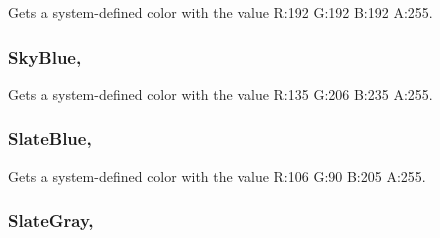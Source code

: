 Gets a system-\/defined color with the value R\+:192 G\+:192 B\+:192 A\+:255.

\hypertarget{structMicrosoft_1_1Xna_1_1Framework_1_1Color_ac3790779955b5c2931d801e40544c3c5}{}
\subsubsection[{Sky\+Blue}]{ Sky\+Blue\hspace{0.3cm}{\ttfamily [static]}, {\ttfamily [get]}}\label{structMicrosoft_1_1Xna_1_1Framework_1_1Color_ac3790779955b5c2931d801e40544c3c5}


Gets a system-\/defined color with the value R\+:135 G\+:206 B\+:235 A\+:255.

\hypertarget{structMicrosoft_1_1Xna_1_1Framework_1_1Color_a5c0c65acec90aac1948898b030dc211e}{}
\subsubsection[{Slate\+Blue}]{ Slate\+Blue\hspace{0.3cm}{\ttfamily [static]}, {\ttfamily [get]}}\label{structMicrosoft_1_1Xna_1_1Framework_1_1Color_a5c0c65acec90aac1948898b030dc211e}


Gets a system-\/defined color with the value R\+:106 G\+:90 B\+:205 A\+:255.

\hypertarget{structMicrosoft_1_1Xna_1_1Framework_1_1Color_a66808c67c15816890404de88552761d7}{}
\subsubsection[{Slate\+Gray}]{ Slate\+Gray\hspace{0.3cm}{\ttfamily [static]}, {\ttfamily [get]}}\label{structMicrosoft_1_1Xna_1_1Framework_1_1Color_a66808c67c15816890404de88552761d7}



